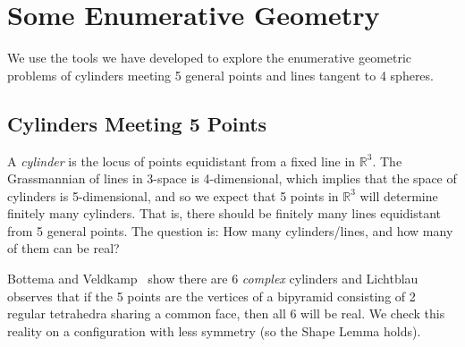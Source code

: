 \section{Some Enumerative Geometry}\label{sec:enumerative}

We use the tools we have developed to explore the enumerative geometric
problems of cylinders meeting 5 general points and lines tangent to
4 spheres. 

\subsection{Cylinders Meeting 5 Points}\label{sec:cylinder}
A {\it cylinder} is the locus of points equidistant from a
fixed line in ${\mathbb R}^3$. 
The Grassmannian of lines in 3-space is 4-dimensional,
which implies that 
the space of cylinders is 5-dimensional, and so we expect that 5 points in  
${\mathbb R}^3$ will determine finitely many cylinders.
That is, there should be finitely many lines equidistant from 5 general points.
The question is: How many cylinders/lines, and how many of them can be real?

Bottema and Veldkamp~\cite{SO:BV77}
show there are 6 {\it complex} cylinders 
and Lichtblau~\cite{SO:Li00} observes that if the 5
points are the vertices of 
a bipyramid consisting of 2 regular tetrahedra sharing a common face, then
all 6 will be real.
We check this reality on a configuration with less symmetry (so the Shape
Lemma holds).

